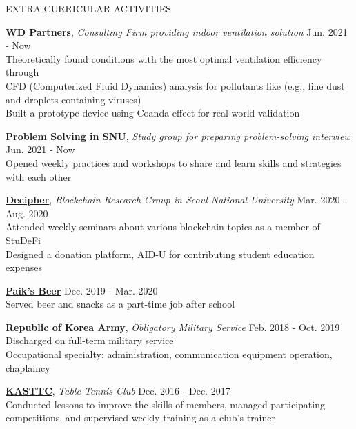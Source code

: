 \documentclass[10pt]{resume} %
\begin{document}

\begin{rSection}{EXTRA-CURRICULAR ACTIVITIES}
%

{\bf WD Partners}, \textit{Consulting Firm providing indoor ventilation solution} \hfill Jun. 2021 - Now\\
Theoretically found conditions with the most optimal ventilation efficiency through \\
CFD (Computerized Fluid Dynamics) analysis for pollutants like (e.g., fine dust and droplets containing viruses) \\
Built a prototype device using Coanda effect for real-world validation 

{\bf Problem Solving in SNU}, \textit{Study group for preparing problem-solving interview} \hfill Jun. 2021 - Now \\
Opened weekly practices and workshops to share and learn skills and strategies with each other

{\bf \href{https://decipher.ac/}{Decipher}}, \textit{Blockchain Research Group in Seoul National University} \hfill Mar. 2020 - Aug. 2020\\
Attended weekly seminars about various blockchain topics as a member of StuDeFi \\
Designed a donation platform, AID-U for contributing student education expenses 

{\bf \href{http://paiksbeer.com/}{Paik’s Beer}} \hfill Dec. 2019 - Mar. 2020\\
Served beer and snacks as a part-time job after school \

{\bf \href{https://www.army.mil.kr/}{Republic of Korea Army}}, \textit{Obligatory Military Service} \hfill Feb. 2018 - Oct. 2019 \\
Discharged on full-term military service \\
Occupational specialty: administration, communication equipment operation, chaplaincy 

{\bf \href{http://kasttc.kr/}{KASTTC}}, \textit{Table Tennis Club} \hfill Dec. 2016 - Dec. 2017\\
Conducted lessons to improve the skills of members, managed participating competitions, and supervised weekly training as a club's trainer \

\end{rSection}


%
\end{document}

